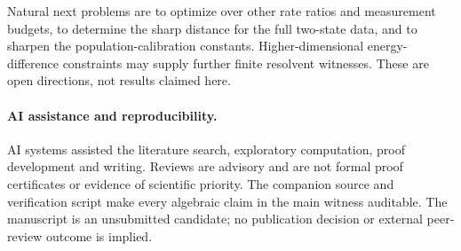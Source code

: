 \documentclass[11pt,a4paper]{article}
\begin{document}
Natural next problems are to optimize over other rate ratios and
measurement budgets, to determine the sharp distance for the full
two-state data, and to sharpen the population-calibration constants. Higher-dimensional energy-difference constraints may supply
further finite resolvent witnesses. These are open directions, not
results claimed here.

\paragraph{AI assistance and reproducibility.}
AI systems assisted the literature search, exploratory computation,
proof development and writing. Reviews are advisory and are not
formal proof certificates or evidence of scientific priority.
The companion source and verification script make every algebraic
claim in the main witness auditable. The manuscript is an unsubmitted
candidate; no publication decision or external peer-review outcome
is implied.
\end{document}
